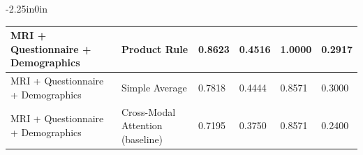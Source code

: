 \documentclass[10pt,letterpaper]{article}
\begin{document}
\begin{table}[!t]
\begin{adjustwidth}{-2.25in}{0in}
\begin{tabular}{|p{3.0cm}|p{3.0cm}|p{2.0cm}|p{2.0cm}|p{2.0cm}|p{2.0cm}|}
                                                                                                                          MRI + Questionnaire + Demographics
                                                                                                                          & Product Rule
                                                                                                                          & 0.8623
                                                                                                                          & 0.4516
                                                                                                                          & 1.0000
                                                                                                                          & 0.2917 \\
                                                                                                                          \hline

                                                                                                                          MRI + Questionnaire + Demographics
                                                                                                                          & Simple Average
                                                                                                                          & 0.7818
                                                                                                                          & 0.4444
                                                                                                                          & 0.8571
                                                                                                                          & 0.3000 \\
                                                                                                                          \hline

                                                                                                                          MRI + Questionnaire + Demographics
                                                                                                                          & Cross-Modal Attention (baseline)
                                                                                                                          & 0.7195
                                                                                                                          & 0.3750
                                                                                                                          & 0.8571
                                                                                                                          & 0.2400 \\
                                                                                                                          \hline


\end{tabular}
\end{adjustwidth}
\end{table}
\end{document}
